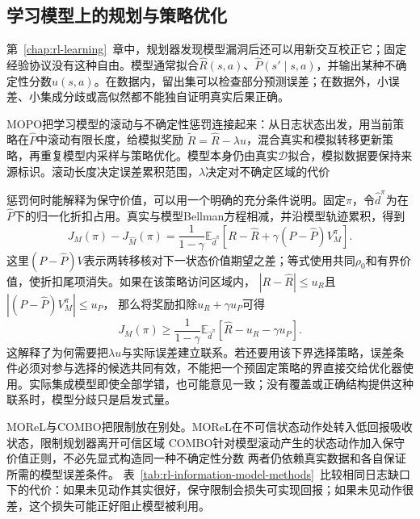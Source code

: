 \subsection{学习模型上的规划与策略优化}
\label{sec:rl-information-model-learning}

第~\ref{chap:rl-learning}~章中，规划器发现模型漏洞后还可以用新交互校正它；固定经验协议没有这种自由。模型通常拟合$\widehat R(s,a)$、$\widehat P(s'\mid s,a)$，并输出某种不确定性分数$u(s,a)$。在数据内，留出集可以检查部分预测误差；在数据外，小误差、小集成分歧或高似然都不能独自证明真实后果正确。

MOPO把学习模型的滚动与不确定性惩罚连接起来：从日志状态出发，用当前策略在$\widehat P$中滚动有限长度，给模拟奖励
$\widetilde R=\widehat R-\lambda u$，混合真实和模拟转移更新策略，再重复模型内采样与策略优化。模型本身仍由真实$\mathcal D$拟合，模拟数据要保持来源标识。滚动长度决定误差累积范围，$\lambda$决定对不确定区域的代价

惩罚何时能解释为保守价值，可以用一个明确的充分条件说明。固定$\pi$，令$\widehat d^\pi$为在$\widehat P$下的归一化折扣占用。真实与模型Bellman方程相减，并沿模型轨迹累积，得到
\begin{equation}
  \label{eq:rl-information-model-telescoping}
  J_M(\pi)-J_{\widehat M}(\pi)
  =\frac1{1-\gamma}\mathbb E_{\widehat d^\pi}
       \left[R-\widehat R
                  +\gamma(P-\widehat P)V_M^\pi\right].
\end{equation}
这里$(P-\widehat P)V$表示两转移核对下一状态价值期望之差；等式使用共同$\rho_0$和有界价值，使折扣尾项消失。如果在该策略访问区域内，
$|R-\widehat R|\leq u_R$且
$|(P-\widehat P)V_M^\pi|\leq u_P$，
那么将奖励扣除$u_R+\gamma u_P$可得
\[
  J_M(\pi)\geq
    \frac1{1-\gamma}\mathbb E_{\widehat d^\pi}
       [\widehat R-u_R-\gamma u_P].
\]
这解释了为何需要把$\lambda u$与实际误差建立联系。若还要用该下界选择策略，误差条件必须对参与选择的候选共同有效，不能把一个预固定策略的界直接交给优化器使用。实际集成模型即使全部学错，也可能意见一致；没有覆盖或正确结构提供这种联系时，模型分歧只是启发式量。

MOReL与COMBO把限制放在别处。MOReL在不可信状态动作处转入低回报吸收状态，限制规划器离开可信区域
COMBO针对模型滚动产生的状态动作加入保守价值正则，不必先显式构造同一种不确定性分数
两者仍依赖真实数据和各自保证所需的模型误差条件。
表~\ref{tab:rl-information-model-methods}~比较相同日志缺口下的代价：如果未见动作其实很好，保守限制会损失可实现回报；如果未见动作很差，这个损失可能正好阻止模型被利用。

